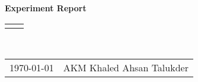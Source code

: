 \documentclass[10pt]{article}
\renewcommand{\title}[1]{\textbf{#1}\\}
\renewcommand{\line}{\begin{tabularx}{\textwidth}{X>{\raggedleft}X}\hline\\\end{tabularx}\\[-0.4cm]}
\newcommand{\leftright}[2]{\begin{tabularx}{\textwidth}{X>{\raggedleft}X}#1%
& #2\\\end{tabularx}\\[-0.5cm]}
\begin{document}
\title{Experiment Report}
\line
\leftright{\today}{AKM Khaled Ahsan Talukder} %
\end{document}

